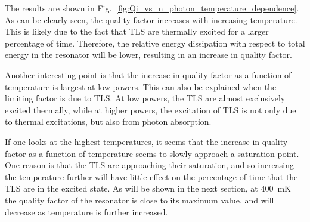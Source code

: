 The results are shown in Fig.~\ref{fig:Qi_vs_n_photon_temperature_dependence}. As can be clearly seen, the quality factor increases with increasing temperature. This is likely due to the fact that TLS are thermally excited for a larger percentage of time. Therefore, the relative energy dissipation with respect to total energy in the resonator will be lower, resulting in an increase in quality factor.

Another interesting point is that the increase in quality factor as a function of temperature is largest at low powers. This can also be explained when the limiting factor is due to TLS. At low powers, the TLS are almost exclusively excited thermally, while at higher powers, the excitation of TLS is not only due to thermal excitations, but also from photon absorption.

If one looks at the highest temperatures, it seems that the increase in quality factor as a function of temperature seems to slowly approach a saturation point. One reason is that the TLS are approaching their saturation, and so increasing the temperature further will have little effect on the percentage of time that the TLS are in the excited state. As will be shown in the next section, at \SI{400}{\milli \kelvin} the quality factor of the resonator is close to its maximum value, and will decrease as temperature is further increased.



